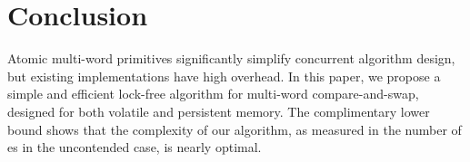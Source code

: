 \section{Conclusion}
\label{sec:conclusion}


Atomic multi-word primitives significantly simplify concurrent algorithm design, but existing implementations have high overhead. In this paper, we propose a simple and efficient lock-free algorithm for multi-word compare-and-swap, designed for both volatile and persistent memory. 
The complimentary lower bound shows that the complexity of our algorithm, as measured in the
number of \cas{}es in the uncontended case, is nearly optimal.


